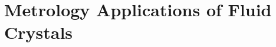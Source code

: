 \documentclass[aagreenthesis.tex]{subfiles}
\begin{document}
\chapter{Metrology Applications of Fluid Crystals}
\section{}
\end{document}
